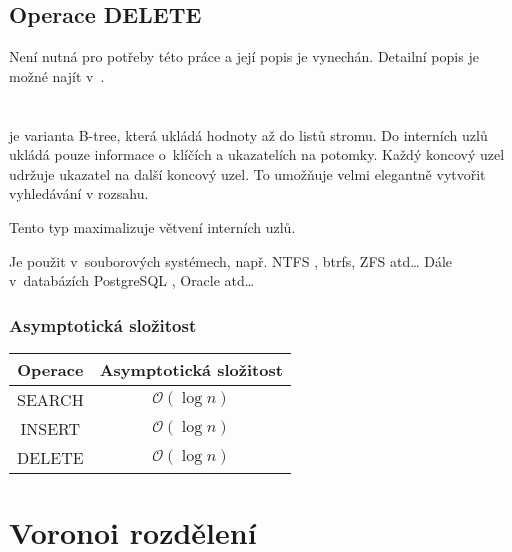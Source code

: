 \subsection{Operace DELETE}

Není nutná pro potřeby této práce a její popis je vynechán. Detailní
popis je možné najít v~\cite{Cormen:2001:IA:580470}.


\section{\BPTree\label{sec:B-plus-tree}}

\BPTree{} je varianta B-tree, která ukládá hodnoty až do
listů stromu. Do interních uzlů ukládá pouze informace o~klíčích
a ukazatelích na potomky. Každý koncový uzel udržuje ukazatel na další
koncový uzel. To umožňuje velmi elegantně vytvořit vyhledávání v rozsahu.

Tento typ maximalizuje větvení interních uzlů.

Je použit v~souborových systémech, např. NTFS \cite{Carrier:2005:FSF:1051914}, btrfs, ZFS \cite{Powell:2012:ZBQ:2328941.2328946} atd\ldots{}
Dále v~databázích PostgreSQL \cite{Geschwinde:2001:PDH:580250}, Oracle \cite{Kyte:2003:EOD:1593880} atd\ldots{}

\begin{figure}[t]
\caption{\BPTree}
\end{figure}



\subsubsection{Asymptotická složitost}

\begin{tabular}{|c|c|}
\hline 
Operace & Asymptotická složitost\tabularnewline
\hline 
\hline 
SEARCH & $\mathcal{O}(\log n)$\tabularnewline
\hline 
INSERT & $\mathcal{O}(\log n)$\tabularnewline
\hline 
DELETE & $\mathcal{O}(\log n)$\tabularnewline
\hline 
\end{tabular}


\section{Voronoi rozdělení}